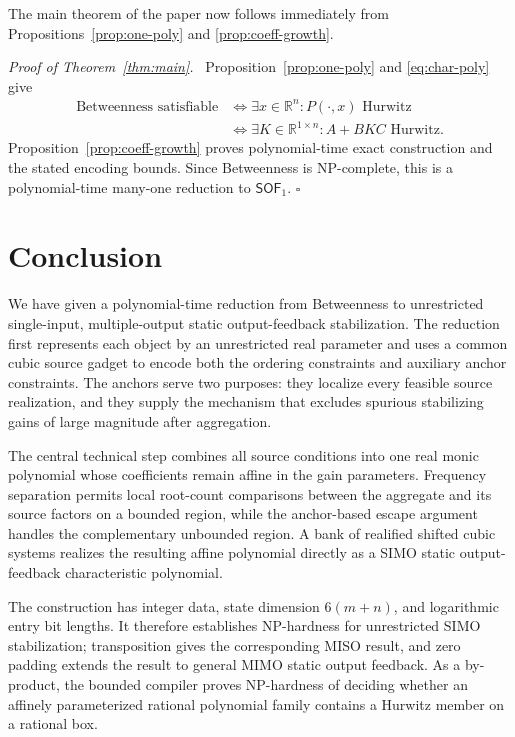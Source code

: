 \documentclass[final,5p,times,twocolumn]{elsarticle}
\newcommand{\R}{\mathbb R}
\newenvironment{proof}[1][Proof]
  {\par\smallskip\noindent\textit{#1.}\ }
  {\hfill$\square$\par\smallskip}
\begin{document}
The main theorem of the paper now follows immediately from Propositions~\ref{prop:one-poly} and \ref{prop:coeff-growth}.
\begin{proof}[Proof of Theorem~\ref{thm:main}]
Proposition~\ref{prop:one-poly} and \eqref{eq:char-poly} give
\[
\begin{aligned}
\text{Betweenness satisfiable}
&\Longleftrightarrow
\exists x\in\R^n:P(\cdot,x)\text{ Hurwitz}\\
&\Longleftrightarrow
\exists K\in\R^{1\times n}:A+BKC\text{ Hurwitz}.
\end{aligned}
\]
Proposition~\ref{prop:coeff-growth} proves polynomial-time exact construction and the stated encoding bounds. Since Betweenness is NP-complete, this is a polynomial-time many-one reduction to $\mathsf{SOF}_1$.
\end{proof}

\section{Conclusion}

We have given a polynomial-time reduction from Betweenness to unrestricted single-input, multiple-output static output-feedback stabilization. The reduction first represents each object by an unrestricted real parameter and uses a common cubic source gadget to encode both the ordering constraints and auxiliary anchor constraints. The anchors serve two purposes: they localize every feasible source realization, and they supply the mechanism that excludes spurious stabilizing gains of large magnitude after aggregation.

The central technical step combines all source conditions into one real monic polynomial whose coefficients remain affine in the gain parameters. Frequency separation permits local root-count comparisons between the aggregate and its source factors on a bounded region, while the anchor-based escape argument handles the complementary unbounded region. A bank of realified shifted cubic systems realizes the resulting affine polynomial directly as a SIMO static output-feedback characteristic polynomial.

The construction has integer data, state dimension $6(m+n)$, and logarithmic entry bit lengths. It therefore establishes NP-hardness for unrestricted SIMO stabilization; transposition gives the corresponding MISO result, and zero padding extends the result to general MIMO static output feedback. As a by-product, the bounded compiler proves NP-hardness of deciding whether an affinely parameterized rational polynomial family contains a Hurwitz member on a rational box.
\end{document}
